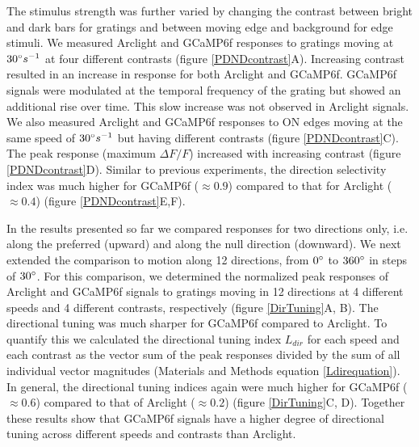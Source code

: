 \documentclass[9pt,lineno]{elife}
\begin{document}
The stimulus strength was further varied by changing the contrast between bright and dark bars for gratings and between moving edge and background for edge stimuli. We measured Arclight and GCaMP6f responses to gratings moving at $30\degree s^{-1}$ at four different contrasts (figure \ref{PDNDcontrast}A). Increasing contrast resulted in an increase in response for both Arclight and GCaMP6f. GCaMP6f signals were modulated at the temporal frequency of the grating but showed an additional rise over time. This slow increase was not observed in Arclight signals. We also measured Arclight and GCaMP6f responses to ON edges moving at the same speed of $30\degree s^{-1}$ but having different contrasts (figure \ref{PDNDcontrast}C). The peak response (maximum $\Delta F/F$) increased with increasing contrast (figure \ref{PDNDcontrast}D). Similar to previous experiments, the direction selectivity index was much higher for GCaMP6f ($\approx0.9$) compared to that for Arclight ($\approx0.4$) (figure \ref{PDNDcontrast}E,F). 

In the results presented so far we compared responses for two directions only, i.e. along the preferred (upward) and along the null direction (downward). We next extended the comparison to motion along 12 directions, from $0\degree$ to $360\degree$ in steps of $30\degree$. For this comparison, we determined the normalized peak responses of Arclight and GCaMP6f signals to gratings moving in 12 directions at 4 different speeds and 4 different contrasts, respectively (figure \ref{DirTuning}A, B). The directional tuning was much sharper for GCaMP6f compared to Arclight. To quantify this we calculated the directional tuning index $L_{dir}$ \parencite{Mazurek2014} for each speed and each contrast as the vector sum of the peak responses divided by the sum of all individual vector magnitudes (Materials and Methods equation \eqref{Ldirequation}). In general, the directional tuning indices again were much higher for GCaMP6f ($\approx0.6$) compared to that of Arclight ($\approx0.2$) (figure \ref{DirTuning}C, D). Together these results show that GCaMP6f signals have a higher degree of directional tuning across different speeds and contrasts than Arclight.
\end{document}
